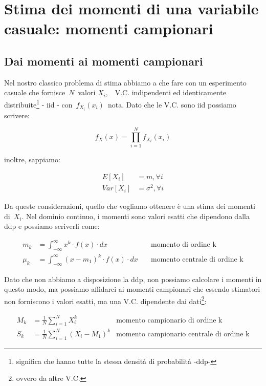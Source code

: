 \section{Stima dei momenti di una variabile casuale: momenti campionari}
\subsection{Dai momenti ai momenti campionari}

Nel nostro classico problema di stima abbiamo a che fare con un esperimento casuale che fornisce $N$ valori $X_i$,  V.C. indipendenti ed identicamente distribuite\footnote{significa che hanno tutte la stessa densità di probabilità -ddp-} - iid - con $f_{X_i}(x_i)$ nota. Dato che le V.C. sono iid possiamo scrivere: 

    \[ f_X(x)=\prod_{i=1}^{N}{f_{X_i}(x_i)} \]

inoltre, sappiamo: 

  \begin{align*}
      E[X_i]&=m, \forall i \\
    Var[X_i]&=\sigma^2, \forall i
  \end{align*}
  
Da queste considerazioni, quello che vogliamo ottenere è una stima dei momenti di $X_i$. 
Nel dominio continuo, i momenti sono valori esatti che dipendono dalla ddp e possiamo scriverli come: 

  \begin{align*}
      m_k&=\int_{-\infty }^{\infty} {x^k \cdot f(x) \cdot dx} \quad &\text{momento di ordine k}\\
    \mu_k&=\int_{-\infty }^{\infty} {(x-m_1)^k \cdot f(x) \cdot dx} \quad &\text{momento centrale di ordine k}
  \end{align*}
  
Dato che non abbiamo a disposizione la ddp, non possiamo calcolare i momenti in questo modo, ma possiamo affidarci ai momenti campionari che essendo stimatori non forniscono i valori esatti, ma una V.C. dipendente dai dati\footnote{ovvero da altre V.C.}:
 
  \begin{align*}
    M_k&=\frac{1}{N}\sum_{i=1}^{N} {X_i^k} &\text{momento campionario di ordine k}\\
    S_k&=\frac{1}{N}\sum_{i=1}^{N} {(X_i-M_1)^k} &\text{momento campionario centrale di ordine k}
  \end{align*}
  
